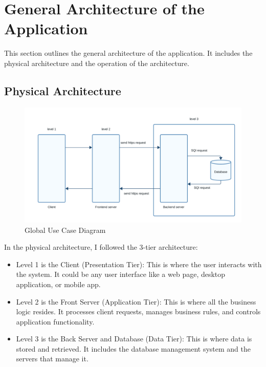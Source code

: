 \clearpage

\section{General Architecture of the Application}

This section outlines the general architecture of the application. It includes the physical architecture and the operation of the architecture.

\subsection{Physical Architecture}

\begin{figure}[ht]
	\centering
	\includegraphics[width=\linewidth]{Images//images/3-tier architecture.png}
	\caption{Global Use Case Diagram}
	\label{fig:Global Use Case Diagram}
\end{figure}

In the physical architecture, I followed the 3-tier architecture:

\begin{itemize}
	\item Level 1 is the Client (Presentation Tier): This is where the user interacts with the system. It could be any user interface like a web page, desktop application, or mobile app.
	\item Level 2 is the Front Server (Application Tier): This is where all the business logic resides. It processes client requests, manages business rules, and controls application functionality.
	\item Level 3 is the Back Server and Database (Data Tier): This is where data is stored and retrieved. It includes the database management system and the servers that manage it.
\end{itemize}


